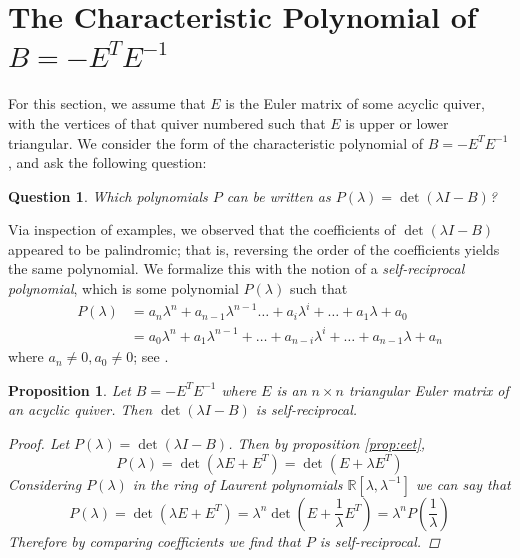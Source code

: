 \documentclass{amsart}
\theoremstyle{theorem}
\theoremstyle{theorem*}
\newtheorem{proposition}[theorem]{Proposition}
\newtheorem{question}[theorem]{Question}
\theoremstyle{definition}
\begin{document}
\section{The Characteristic Polynomial of $B = -E^T E^{-1}$}
\label{sec:charpoly}

For this section, we assume that $E$ is the Euler matrix of some acyclic quiver,
with the vertices of that quiver numbered such that $E$ is upper or lower
triangular. We consider the form of the characteristic polynomial
of $B = - E^T E^{-1}$, and ask the following question:

\begin{question}
    Which polynomials $P$ can be written as $P(\lambda) = \det(\lambda I - B)$?
\end{question}

Via inspection of examples, we observed that the coefficients of
$\det(\lambda I - B)$ appeared to be palindromic; that is, reversing 
the order of the coefficients yields the same polynomial. We formalize
this with the notion of a \textit{self-reciprocal polynomial},
which is some polynomial $P(\lambda)$ such that
\begin{align*}
    P(\lambda) &= a_n \lambda^n + a_{n -1} \lambda^{n - 1} \dots
    + a_i \lambda^i + \dots + a_1 \lambda + a_0
       \\&= a_0 \lambda^n + a_{1} \lambda^{n - 1} + \dots
       + a_{n - i} \lambda^{i} + \dots + a_{n - 1} \lambda + a_n
\end{align*}
where $a_n \neq 0, a_0 \neq 0$; see \cite{syz}.

\begin{proposition}
    Let $B = - E^T E^{-1}$ where $E$ is an $n\times n$ triangular Euler
    matrix of an acyclic quiver. Then $\det(\lambda I - B)$ is self-reciprocal.
    \begin{proof}
        Let $P(\lambda) = \det(\lambda I - B)$. Then by proposition
        \ref{prop:eet},
        $$P(\lambda) = \det(\lambda E + E^T) = \det(E + \lambda E^T)$$
        Considering $P(\lambda)$ in the ring of Laurent polynomials $\mathbb{R}[\lambda, \lambda^{-1}]$
        we can say that 
        $$P(\lambda) = \det(\lambda E+E^T)
        = \lambda ^n \det \left(E + \frac{1}{\lambda} E^T \right)
        = \lambda^n P\left(\frac{1}{\lambda}\right)$$
        Therefore by comparing coefficients we find that $P$ is self-reciprocal.
    \end{proof}
\end{proposition}
\end{document}
